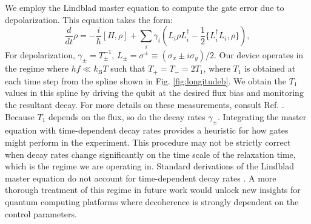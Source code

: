 \documentclass[
  amsfonts,
  amsmath,
  amssymb,
  pra,
  twocolumn,
  superscriptaddress,
]{revtex4-2}
\begin{document}
We employ the Lindblad master equation
to compute the gate error due to depolarization.
This equation takes the form:
\begin{equation}
  \frac{d}{dt} \rho = -\frac{i}{\hbar} [H, \rho]
  + \sum_{i} \gamma_{i} (L_{i} \rho L_{i}^{\dagger}
  - \frac{1}{2} \{L_{i}^{\dagger} L_{i}, \rho\}),
\end{equation}
For depolarization, $\gamma_{\pm} = T_{\pm}^{-1}$,
$L_{\pm} = \sigma^{\pm} \equiv (\sigma_{x} \pm i \sigma_{y})/2$.
Our device operates in the regime where $hf \ll k_{\textrm{B}}T$ such that
$T_{+} = T_{-} = 2 T_{1}$, where $T_{1}$ is obtained at each time step
from the spline shown in Fig. \ref{fig:longitudeb}.
We obtain the $T_{1}$ values in this spline
by driving the qubit at the desired flux bias
and monitoring the resultant decay. For more details
on these measurements, consult Ref. \cite{zhang2020universal}.
Because $T_{1}$ depends on the flux, so do
the decay rates $\gamma_{\pm}$.
Integrating the master equation with time-dependent decay rates
provides a heuristic for how gates might  perform in
the experiment. 
This procedure may not be strictly correct
when decay rates change significantly on the time scale of the relaxation time,
which is the regime we are operating in. Standard
derivations of the Lindblad master equation do not account for
time-dependent decay rates \cite{manzano2020a}. A more thorough
treatment of this regime in future work would unlock new insights for
quantum computing platforms where decoherence is strongly
dependent on the control parameters.
\end{document}
